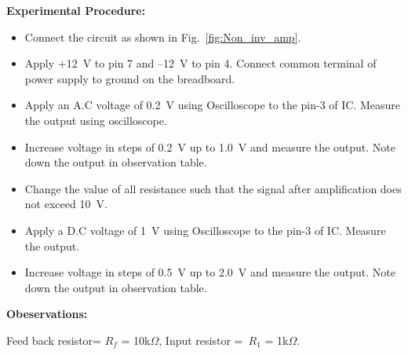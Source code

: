 \documentclass[11pt]{scrreprt}
\begin{document}
\noindent\textbf{Experimental Procedure:}
\begin{itemize}
\item Connect the circuit as shown in Fig.~\ref{fig:Non_inv_amp}.
\item Apply +12~V to pin 7 and –12~V to pin 4. Connect common terminal of power supply to ground on the breadboard.
\item Apply an A.C voltage of 0.2~V using Oscilloscope to the pin-3 of IC. Measure the output using oscilloscope.
\item Increase voltage in steps of 0.2~V up to 1.0~V and measure the output. Note down the output in observation table.
\item Change the value of all resistance such that the signal after amplification does not exceed 10~V.
\item Apply a D.C voltage of 1~V using Oscilloscope to the pin-3 of IC. Measure the output.
\item Increase voltage in steps of 0.5~V up to 2.0~V and measure the output. Note down the output in observation table.
\end{itemize}

\noindent\textbf{Obeservations:}

Feed back resistor= $R_f$ = 10k$\Omega$, Input resistor =~$R_1$ = 1k$\Omega$.
\end{document}
